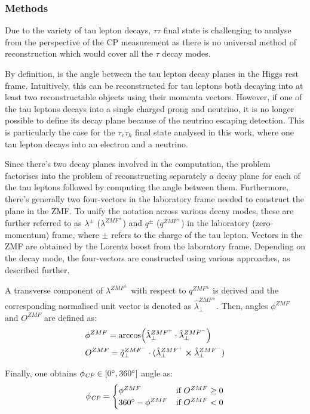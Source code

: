 \subsubsection{Methods}
Due to the variety of tau lepton decays, $\tau\tau$ final state is challenging to analyse from the perspective of the CP measurement as there is no universal method of \phicp reconstruction which would cover all the $\tau$ decay modes. 

By definition, \phicp is the angle between the tau lepton decay planes in the Higgs rest frame. Intuitively, this can be reconstructed for tau leptons both decaying into at least two reconstructable objects using their momenta vectors. However, if one of the tau leptons decays into a single charged prong and neutrino, it is no longer possible to define its decay plane because of the neutrino escaping detection. This is particularly the case for the $\tau_e\tau_h$ final state analysed in this work, where one tau lepton decays into an electron and a neutrino.

Since there's two decay planes involved in the \phicp computation, the problem factorises into the problem of reconstructing separately a decay plane for each of the tau leptons followed by computing the angle between them. Furthermore, there's generally two four-vectors in the laboratory frame needed to construct the plane in the ZMF. To unify the notation across various decay modes, these are further referred to as $\lambda^\pm$ ($\lambda^{ZMF^\pm}$) and $q^\pm$ ($q^{ZMF^\pm}$) in the laboratory (zero-momentum) frame, where $\pm$ refers to the charge of the tau lepton. Vectors in the ZMF are obtained by the Lorentz boost from the laboratory frame. Depending on the decay mode, the four-vectors are constructed using various approaches, as described further.

A transverse component of $\lambda^{ZMF^\pm}$ with respect to $q^{ZMF^\pm}$ is derived and the corresponding normalised unit vector is denoted as $\hat{\lambda}_\perp^{ZMF^\pm}$. Then, angles $\phi^{ZMF}$ and $O^{ZMF}$ are defined as:
\begin{align}
    &\phi^{ZMF} = \arccos(\hat{\lambda}_\perp^{ZMF^+} \cdot \hat{\lambda}_\perp^{ZMF^-})\\
    &O^{ZMF} = \hat{q}_\perp^{ZMF^-} \cdot (\hat{\lambda}_\perp^{ZMF^+} \cross \hat{\lambda}_\perp^{ZMF^-})
\end{align}

Finally, one obtains $\phi_{\textit{CP}} \in [0^\circ,360^\circ]$ angle as:
\begin{equation}
    \phi_{\textit{CP}} = 
    \begin{cases}
    \phi^{ZMF} & \text{if} ~O^{ZMF} \geq 0 \\
    360^\circ - \phi^{ZMF} & \text{if} ~O^{ZMF} < 0
    \end{cases}
\end{equation}

